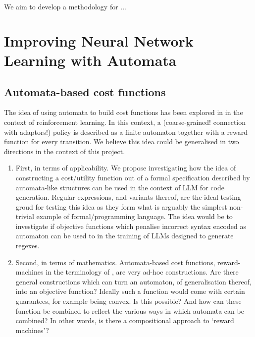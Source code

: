 \documentclass[11pt,a4paper]{article}
\begin{document}
		
		We aim to develop a methodology for ...
		
		
	\section{Improving Neural Network Learning with Automata}
		\subsection{Automata-based cost functions}
			The idea of using automata to build cost functions has been explored in \cite{icarte2022reward} in the context of reinforcement learning. In this context, a (coarse-grained! connection with adaptors!) policy is described as a finite automaton together with a reward function for every transition.  
			We believe this idea could be generalised in two directions in the context of this project.
			\begin{enumerate}
				\item First, in terms of applicability. We propose investigating how the idea of constructing a cost/utility function out of a formal specification described by automata-like structures can be used in the context of LLM for code generation. Regular expressions, and variants thereof, are the ideal testing groud for testing this idea as they form what is arguably the simplest non-trivial example of formal/programming language. The idea would be to investigate if objective functions which penalise incorrect syntax encoded as automaton can be used to in the training of LLMs designed to generate regexes.
				\item Second, in terms of mathematics. Automata-based cost functions, reward-machines in the terminology of \cite{icarte2022reward}, are very ad-hoc constructions. Are there general constructions which can turn an automaton, of generalisation thereof, into an objective function? Ideally such a function would come with certain guarantees, for example being convex. Is this possible? And how can these function be combined to reflect the various ways in which automata can be combined? In other words, is there a compositional approach to `reward machines'?
			\end{enumerate} 
		
\end{document}
